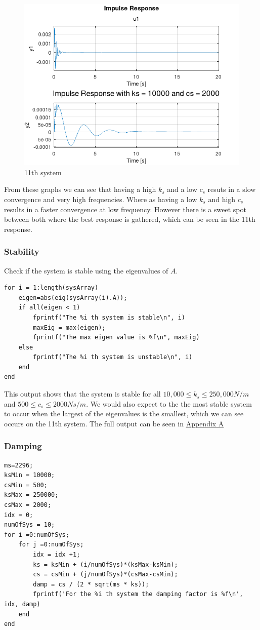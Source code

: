 \documentclass[11pt]{article}
\begin{document}
\begin{figure}[h]
    \centering
    \includegraphics[width=.9\linewidth]{ENG204-Assignment-2-Impulse-Response-11.png}
    \caption{11th system}
    \label{fig:impulse_response_22}
\end{figure}

From these graphs we can see that having a high \(k_s\) and a low \(c_s\) resuts in a slow convergence and very high frequencies. Where as having a low \(k_s\) and high \(c_s\) results in a faster convergence at low frequency. However there is a sweet spot between both where the best response is gathered, which can be seen in the 11th response.
\subsubsection{Stability}
\label{sec:org6a1b386}
Check if the system is stable using the eigenvalues of \(A\).
\begin{verbatim}
for i = 1:length(sysArray)
    eigen=abs(eig(sysArray(i).A));
    if all(eigen < 1)
        fprintf("The %i th system is stable\n", i)
        maxEig = max(eigen);
        fprintf("The max eigen value is %f\n", maxEig)
    else
        fprintf("The %i th system is unstable\n", i)
    end
end
\end{verbatim}


This output shows that the system is stable for all \(10,000\leq k_s\leq 250,000 N/m\) and \(500 \leq c_s \leq 2000 Ns/m\). We would also expect to the the most stable system to occur when the largest of the eigenvalues is the smallest, which we can see occurs on the 11th system. The full output can be seen in \hyperref[sec:org5ab6351]{Appendix A}
\subsubsection{Damping}
\label{sec:org77cbc0f}
\begin{verbatim}
ms=2296;
ksMin = 10000;
csMin = 500;
ksMax = 250000;
csMax = 2000;
idx = 0;
numOfSys = 10;
for i =0:numOfSys;
    for j =0:numOfSys;
        idx = idx +1;
        ks = ksMin + (i/numOfSys)*(ksMax-ksMin);
        cs = csMin + (j/numOfSys)*(csMax-csMin);
        damp = cs / (2 * sqrt(ms * ks));
        fprintf('For the %i th system the damping factor is %f\n', idx, damp)
    end
end
\end{verbatim}
\end{document}
